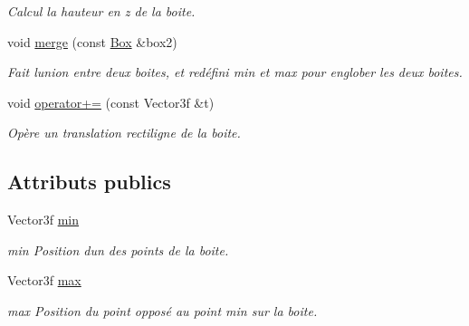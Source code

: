 \begin{DoxyCompactItemize}
\begin{DoxyCompactList}\small\item\em Calcul la hauteur en {\itshape z} de la boite. \end{DoxyCompactList}\item 
void \hyperlink{class_box_a5aebe0463a5c45d1cf966fbccabef94f}{merge} (const \hyperlink{class_box}{Box} \&box2)
\begin{DoxyCompactList}\small\item\em Fait l\textquotesingle{}union entre deux boites, et redéfini min et max pour englober les deux boites. \end{DoxyCompactList}\item 
void \hyperlink{class_box_a8b1ad9cb82546788f3ad6001429b5c5f}{operator+=} (const Vector3f \&t)
\begin{DoxyCompactList}\small\item\em Opère un translation rectiligne de la boite. \end{DoxyCompactList}\end{DoxyCompactItemize}
\subsection*{Attributs publics}
\begin{DoxyCompactItemize}
\item 
\hypertarget{class_box_a4b5893565a3e2b26361338b19af0671a}{}Vector3f \hyperlink{class_box_a4b5893565a3e2b26361338b19af0671a}{min}\label{class_box_a4b5893565a3e2b26361338b19af0671a}

\begin{DoxyCompactList}\small\item\em min Position d\textquotesingle{}un des points de la boite. \end{DoxyCompactList}\item 
\hypertarget{class_box_ac7d2365a0645043a21a055942019cd74}{}Vector3f \hyperlink{class_box_ac7d2365a0645043a21a055942019cd74}{max}\label{class_box_ac7d2365a0645043a21a055942019cd74}

\begin{DoxyCompactList}\small\item\em max Position du point opposé au point {\itshape min} sur la boite. \end{DoxyCompactList}\end{DoxyCompactItemize}
